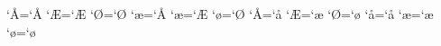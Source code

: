 %
\uccode`^^c5=`^^c5 \uccode`^^c6=`^^c6 \uccode`^^d8=`^^d8
\uccode`^^e6=`^^c5 \uccode`^^e6=`^^c6 \uccode`^^f8=`^^d8
\lccode`^^c5=`^^e5 \lccode`^^c6=`^^e6 \lccode`^^d8=`^^f8
\lccode`^^e5=`^^e5 \lccode`^^e6=`^^e6 \lccode`^^f8=`^^f8
